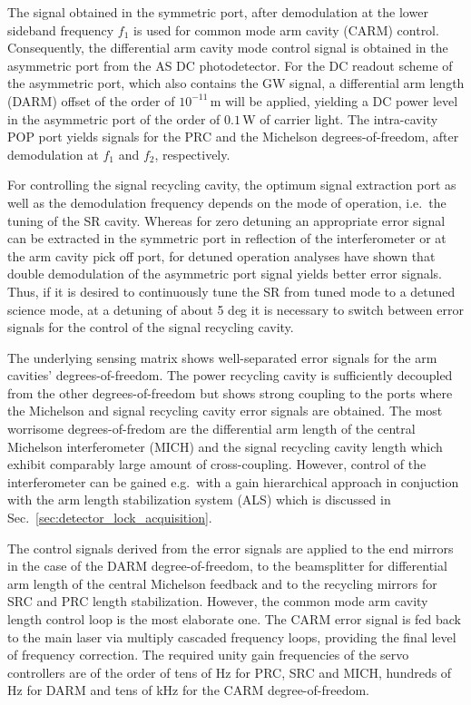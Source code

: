 The signal obtained in the symmetric port, after demodulation at the lower sideband frequency $f_1$ is used for common mode arm cavity (CARM) control. 
Consequently, the differential arm cavity mode control signal is obtained in the asymmetric port from the AS DC photodetector. For the DC readout scheme 
of the asymmetric port, which also contains the GW signal, a differential arm length (DARM) offset of the order of $10^{-11}$\,m will be applied, yielding a DC power level in 
the asymmetric port of the order of $0.1$\,W of carrier light.
The intra-cavity POP port yields signals for the PRC and the Michelson degrees-of-freedom, after demodulation at
$f_1$ and $f_2$, respectively. 

For controlling the signal recycling cavity, the optimum signal extraction port as well as the demodulation frequency depends on the mode of operation, i.e.\ the tuning 
of the SR cavity. Whereas for zero detuning an appropriate error signal can be extracted in the symmetric port in reflection of the
interferometer or at the arm cavity pick off port, for detuned operation analyses have shown that double demodulation of the asymmetric port signal
yields better error signals. Thus, if it is desired to continuously tune the SR from tuned mode to a detuned science mode, at a detuning of about
5 deg it is necessary to switch between error signals for the control of the signal recycling cavity.

The underlying sensing matrix shows well-separated error signals for the arm cavities' degrees-of-freedom. The power recycling cavity is sufficiently decoupled from the other degrees-of-freedom
but shows strong coupling to the ports where the Michelson and signal recycling cavity error signals are obtained. The most worrisome degrees-of-fredom are the differential arm length of the central Michelson interferometer (MICH) and the signal recycling
cavity length which exhibit comparably large amount of cross-coupling. However, control of the interferometer can be gained e.g.\ with a gain hierarchical approach in conjuction with the arm length stabilization system (ALS) which
is discussed in Sec.~\ref{sec:detector_lock_acquisition}.

The control signals derived from the error signals are applied to the end mirrors in the case of the DARM degree-of-freedom, to the beamsplitter for differential arm length of the central Michelson feedback  and to the recycling
mirrors for SRC and PRC length stabilization. However, the common mode arm cavity length control loop is the most elaborate one. The CARM error signal is fed back to the main laser via multiply cascaded
frequency loops, providing the final level of frequency correction.
The required unity gain frequencies of the servo controllers are of the order of tens of Hz for PRC, SRC and MICH, hundreds of Hz for 
DARM and tens of kHz for the CARM degree-of-freedom. 

